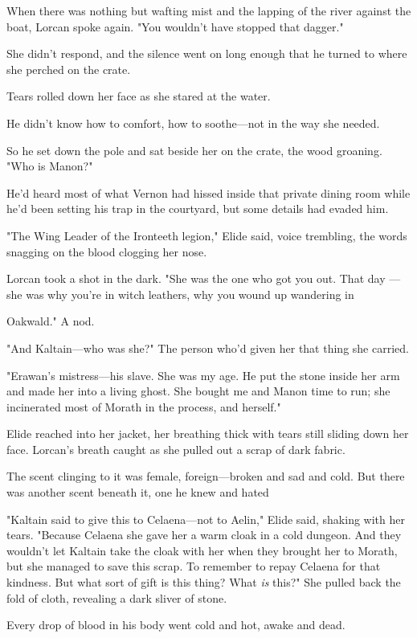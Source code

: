 When there was nothing but wafting mist and the lapping of the river against the boat, Lorcan spoke again. "You wouldn't have stopped that dagger."

She didn't respond, and the silence went on long enough that he turned to where she perched on the crate.

Tears rolled down her face as she stared at the water.

He didn't know how to comfort, how to soothe---not in the way she needed.

So he set down the pole and sat beside her on the crate, the wood groaning. "Who is Manon?"

He'd heard most of what Vernon had hissed inside that private dining room while he'd been setting his trap in the courtyard, but some details had evaded him.

"The Wing Leader of the Ironteeth legion," Elide said, voice trembling, the words snagging on the blood clogging her nose.

Lorcan took a shot in the dark. "She was the one who got you out. That day ---she was why you're in witch leathers, why you wound up wandering in

Oakwald." A nod.

"And Kaltain---who was she?" The person who'd given her that thing she carried.

"Erawan's mistress---his slave. She was my age. He put the stone inside her arm and made her into a living ghost. She bought me and Manon time to run; she incinerated most of Morath in the process, and herself."

Elide reached into her jacket, her breathing thick with tears still sliding down her face. Lorcan's breath caught as she pulled out a scrap of dark fabric.

The scent clinging to it was female, foreign---broken and sad and cold. But there was another scent beneath it, one he knew and hated 

"Kaltain said to give this to Celaena---not to Aelin," Elide said, shaking with her tears. "Because Celaena  she gave her a warm cloak in a cold dungeon. And they wouldn't let Kaltain take the cloak with her when they brought her to Morath, but she managed to save this scrap. To remember to repay Celaena for that kindness. But  what sort of gift is this thing? What \emph{is} this?" She pulled back the fold of cloth, revealing a dark sliver of stone.

Every drop of blood in his body went cold and hot, awake and dead.

